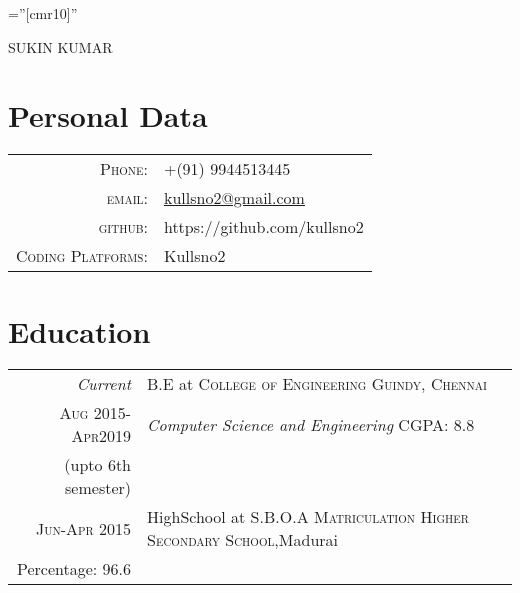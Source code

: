 \documentclass[a4paper,10pt]{article}
\begin{document}

\pagestyle{empty} %

\font\fb=''[cmr10]'' %

\par{\centering
		{\Huge SUKIN \textsc{KUMAR}
	}\bigskip\par}

\section{Personal Data}

\begin{tabular}{rl}
    \textsc{Phone:}     & +(91) 9944513445\\
    \textsc{email:}     &
    \href{mailto:kullsno2@gmail.com}{kullsno2@gmail.com}\\
    \textsc{github:}    & https://github.com/kullsno2\\
    \textsc{Coding Platforms:}   & Kullsno2
\end{tabular}

\section{Education}
\begin{tabular}{r|p{11cm}}
 \emph{Current} & B.E at \textsc{College of Engineering Guindy, Chennai}\\\textsc{Aug 2015-Apr2019}&\emph{Computer Science and Engineering} \qquad \qquad \qquad \qquad \quad CGPA: 8.8\\{}\hfill(upto 6th semester)\multicolumn{2}{c}{} \\
 \textsc{Jun-Apr 2015} & HighSchool at \textsc{S.B.O.A Matriculation Higher Secondary School},Madurai\\    \hfill Percentage: 96.6\multicolumn{2}{c}{}
\end{tabular}
\end{document}
